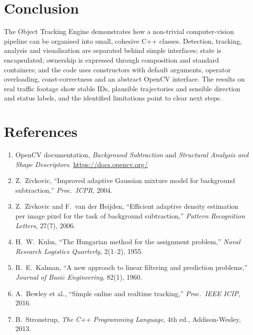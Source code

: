 \documentclass[12pt,a4paper,oneside]{book}
\begin{document}
\section{Conclusion}
The Object Tracking Engine demonstrates how a non-trivial computer-vision pipeline can be organised into small, cohesive C++ classes. Detection, tracking, analysis and visualisation are separated behind simple interfaces; state is encapsulated; ownership is expressed through composition and standard containers; and the code uses constructors with default arguments, operator overloading, const-correctness and an abstract OpenCV interface. The results on real traffic footage show stable IDs, plausible trajectories and sensible direction and status labels, and the identified limitations point to clear next steps.

\section*{References}
\begin{enumerate}
    \item OpenCV documentation, \emph{Background Subtraction} and \emph{Structural Analysis and Shape Descriptors}. \url{https://docs.opencv.org/}
    \item Z.\ Zivkovic, ``Improved adaptive Gaussian mixture model for background subtraction,'' \emph{Proc.\ ICPR}, 2004.
    \item Z.\ Zivkovic and F.\ van der Heijden, ``Efficient adaptive density estimation per image pixel for the task of background subtraction,'' \emph{Pattern Recognition Letters}, 27(7), 2006.
    \item H.\ W.\ Kuhn, ``The Hungarian method for the assignment problem,'' \emph{Naval Research Logistics Quarterly}, 2(1--2), 1955.
    \item R.\ E.\ Kalman, ``A new approach to linear filtering and prediction problems,'' \emph{Journal of Basic Engineering}, 82(1), 1960.
    \item A.\ Bewley et al., ``Simple online and realtime tracking,'' \emph{Proc.\ IEEE ICIP}, 2016.
    \item B.\ Stroustrup, \emph{The C++ Programming Language}, 4th ed., Addison-Wesley, 2013.
\end{enumerate}
\end{document}
